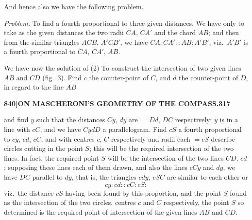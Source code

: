 \documentclass[12pt,a4paper]{article}
\theoremstyle{definition}
\begin{document}
And hence also we have the following problem.

\textit{Problem.} To find a fourth proportional to three given distances. We have only to take as the given distances the two radii $CA$, $CA'$ and the chord $AB$; and then from the similar triangles $ACB$, $A'CB'$, we have $CA : CA' :: AB : A'B'$, viz.\ $A'B'$ is a fourth proportional to $CA$, $CA'$, $AB$.

We have now the solution of (2) To construct the intersection of two given lines $AB$ and $CD$ (fig.\ 3). Find $c$ the counter-point of $C$, and $d$ the counter-point of $D$, in regard to the line $AB$

\begin{figure}[H]
\centering
{}
\end{figure}

\newpage
\setcounter{page}{317}

\noindent\textbf{840]}\hfill\textbf{ON MASCHERONI'S GEOMETRY OF THE COMPASS.}\hfill\textbf{317}

\bigskip

\noindent and find $y$ such that the distances $Cy$, $dy$ are $= Dd$, $DC$ respectively; $y$ is in a line with $cC$, and we have $CydD$ a parallelogram. Find $cS$ a fourth proportional to $cy$, $cd$, $cC$, and with centres $c$, $C$ respectively and radii each $= cS$ describe circles cutting in the point $S$; this will be the required intersection of the two lines. In fact, the required point $S$ will be the intersection of the two lines $CD$, $cd$: supposing these lines each of them drawn, and also the lines $cCy$ and $dy$, we have $DC$ parallel to $dy$, that is, the triangles $cdy$, $cSC$ are similar to each other or
\[
cy : cd :: cC : cS:
\]
viz.\ the distance $cS$ having been found by this proportion, and the point $S$ found as the intersection of the two circles, centres $c$ and $C$ respectively, the point $S$ so determined is the required point of intersection of the given lines $AB$ and $CD$.
\end{document}
